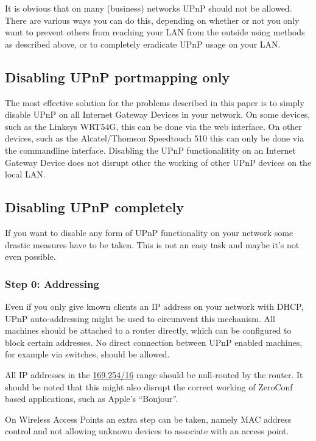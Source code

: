 \documentclass[10pt]{article}
\begin{document}
It is obvious that on many (business) networks UPnP should not be allowed.
There are various ways you can do this, depending on whether or not you
only want to prevent others from reaching your LAN from the outside using
methods as described above, or to completely eradicate UPnP usage on your
LAN.

\subsection{Disabling UPnP portmapping only}

The most effective solution for the problems described in this paper is to
simply disable UPnP on all Internet Gateway Devices in your network. On some
devices, such as the Linksys WRT54G, this can be done via the web interface.
On other devices, such as the Alcatel/Thomson Speedtouch 510 this can only be
done via the commandline interface. Disabling the UPnP functionalitity on
an Internet Gateway Device does not disrupt other the working of other UPnP
devices on the local LAN.

\subsection{Disabling UPnP completely}

If you want to disable any form of UPnP functionality on your network some
drastic measures have to be taken. This is not an easy task and maybe it's
not even possible.

\subsubsection{Step 0: Addressing}

Even if you only give known clients an IP address on your network with
DHCP, UPnP auto-addressing might be used to circumvent this mechanism.
All machines should be attached to a router directly, which can be configured
to block certain addresses. No direct connection between UPnP enabled
machines, for example via switches, should be allowed.

All IP addresses in the \url{169.254/16} range should be null-routed by
the router. It should be noted that this might also disrupt the correct
working of ZeroConf based applications, such as Apple's ``Bonjour''.

On Wireless Access Points an extra step can be taken, namely MAC address
control and not allowing unknown devices to associate with an access point.
\end{document}
